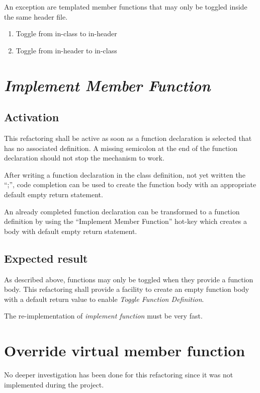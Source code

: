 An exception are templated member functions that may only be toggled inside the 
same header file.
\begin{enumerate}
\item Toggle from in-class to in-header
\item Toggle from in-header to in-class
\end{enumerate}

\section{\textit{Implement Member Function}}

\subsection{Activation}
This refactoring shall be active as soon as a function declaration is selected 
that has no associated definition. A missing semicolon at the end of the 
function declaration should not stop the mechanism to work.

After writing a function declaration in the class definition, not yet written
the ``;'', code completion can be used to create the function body with an
appropriate default empty return statement.\newline

An already completed function declaration can be transformed to a function
definition by using the ``Implement Member Function'' hot-key which creates a
body with default empty return statement.

\subsection{Expected result}
As described above, functions may only be toggled when they provide a function 
body. This refactoring shall provide a facility to create an empty function body 
with a default return value to enable \textit{Toggle Function Definition}.

The re-implementation of \textit{implement function} must be very fast. 

\section{Override virtual member function}

No deeper investigation has been done for this refactoring since it was not 
implemented during the project.


